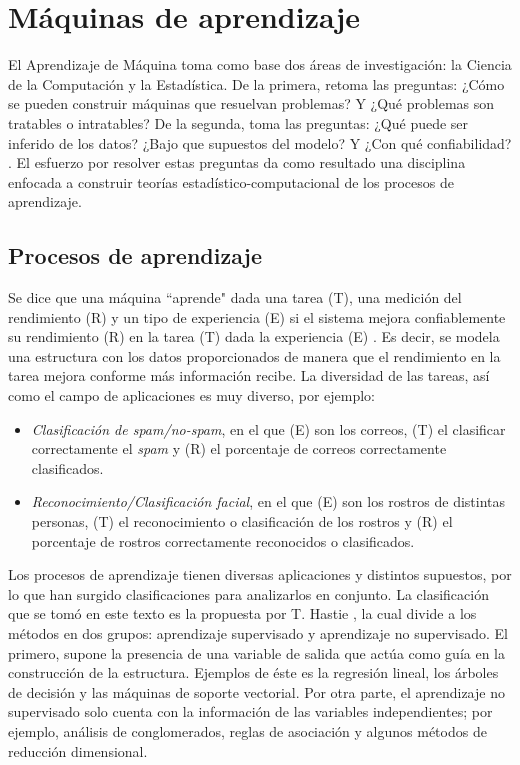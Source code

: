 \chapter{Máquinas de aprendizaje}
\label{ch:chapter1}
 
El Aprendizaje de Máquina toma como base dos áreas de investigación:
la Ciencia de la Computación y la Estadística. De la primera, retoma las preguntas: ¿Cómo se pueden construir máquinas que resuelvan problemas? Y ¿Qué problemas son tratables o intratables? De la segunda, toma las preguntas: ¿Qué puede ser inferido de los datos? ¿Bajo que supuestos del modelo? Y ¿Con qué confiabilidad? \cite{mitchell2006discipline}. El esfuerzo por resolver estas preguntas da como resultado una disciplina enfocada a construir teorías estadístico-computacional de los procesos de aprendizaje.

\section{Procesos de aprendizaje}

Se dice que una máquina ``aprende" dada una tarea (T), una medición del rendimiento (R) y un tipo de experiencia (E) si el sistema mejora confiablemente su rendimiento (R) en la tarea (T) dada la experiencia (E) \cite{mitchell2006discipline}. Es decir, se modela una estructura con los datos proporcionados de manera que el rendimiento en la tarea mejora conforme más información recibe. La diversidad de las tareas, así como el campo de aplicaciones es muy diverso, por ejemplo:

\begin{itemize} 

\item \textit{Clasificación de spam/no-spam}, en el que (E) son los correos, (T) el clasificar correctamente el \textit{spam} y (R) el porcentaje de correos correctamente clasificados.

\item \textit{Reconocimiento/Clasificación facial}, en el que (E) son los rostros de distintas personas, (T) el reconocimiento o clasificación de los rostros y (R) el porcentaje de rostros correctamente reconocidos o clasificados.

\end{itemize} 

Los procesos de aprendizaje tienen diversas aplicaciones y distintos supuestos, por lo que han surgido clasificaciones para analizarlos en conjunto. La clasificación que se tomó en este texto es la propuesta por T. Hastie \cite{hastie2009elements}, la cual divide a los métodos en dos grupos: aprendizaje supervisado y aprendizaje no supervisado. El primero, supone la presencia de una variable de salida que actúa como guía en la construcción de la estructura. Ejemplos de éste es la regresión lineal, los árboles de decisión y las máquinas de soporte vectorial. Por otra parte, el aprendizaje no supervisado solo cuenta con la información de las variables independientes; por ejemplo, análisis de conglomerados, reglas de asociación y algunos métodos de reducción dimensional. 

